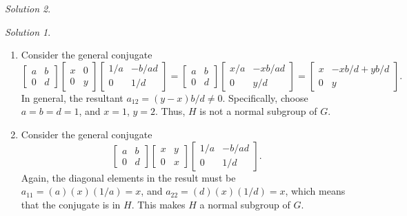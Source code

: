 \documentclass[11pt]{report}
\theoremstyle{remark}
\newtheorem*{solution}{Solution}
\begin{document}
\begin{solution}
\begin{solution}
\begin{enumerate}
            \item Consider the general conjugate \[
                \begin{bmatrix}
                    a & b \\ 0 & d
                \end{bmatrix} \begin{bmatrix}
                    x & 0 \\ 0 & y
                \end{bmatrix} \begin{bmatrix}
                    1 / a & -b / ad \\ 0 & 1 / d
                \end{bmatrix} = \begin{bmatrix}
                    a & b \\ 0 & d
                \end{bmatrix} \begin{bmatrix}
                    x / a & -xb / ad \\ 0 & y / d
                \end{bmatrix} = \begin{bmatrix}
                    x & -xb / d + yb / d \\ 0 & y
                \end{bmatrix}.
            \] In general, the resultant $a_{12} = (y - x) b / d \neq 0$.
            Specifically, choose $a = b = d = 1$, and $x = 1$, $y = 2$. Thus, $H$ is
            not a normal subgroup of $G$.
            
            \item Consider the general conjugate \[
                \begin{bmatrix}
                    a & b \\ 0 & d
                \end{bmatrix} \begin{bmatrix}
                    x & y \\ 0 & x
                \end{bmatrix} \begin{bmatrix}
                    1 / a & -b / ad \\ 0 & 1 / d
                \end{bmatrix}.
            \] Again, the diagonal elements in the result must be $a_{11} = (a)(x)(1
            / a) = x$, and $a_{22} = (d)(x)(1 / d) = x$, which means that the
            conjugate is in $H$. This makes $H$ a normal subgroup of $G$.


\end{enumerate}
\end{solution}
\end{solution}
\end{document}
